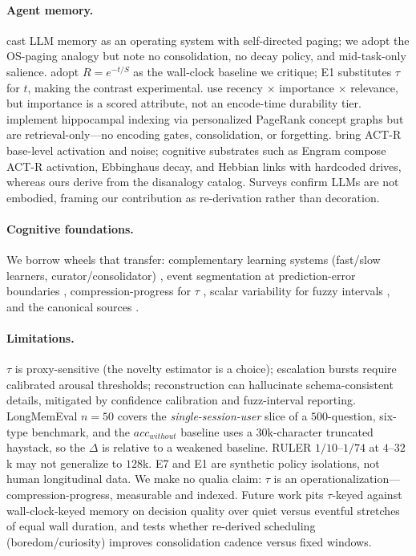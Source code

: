 \documentclass[letterpaper]{article}
\begin{document}
\paragraph{Agent memory.} \citet{packer2023memgpt} cast LLM memory as an operating system with self-directed paging; we adopt the OS-paging analogy but note no consolidation, no decay policy, and mid-task-only salience. \citet{zhong2023memorybank} adopt $R=e^{-t/S}$ as the wall-clock baseline we critique; E1 substitutes $\tau$ for $t$, making the contrast experimental. \citet{park2023generative} use recency $\times$ importance $\times$ relevance, but importance is a scored attribute, not an encode-time durability tier. \citet{gutierrez2024hipporag} implement hippocampal indexing via personalized PageRank concept graphs but are retrieval-only---no encoding gates, consolidation, or forgetting. \citet{liu2024actr} bring ACT-R base-level activation and noise; cognitive substrates such as Engram \citep{engram2024} compose ACT-R activation, Ebbinghaus decay, and Hebbian links with hardcoded drives, whereas ours derive from the disanalogy catalog. Surveys \citep{niu2024survey} confirm LLMs are not embodied, framing our contribution as re-derivation rather than decoration.

\paragraph{Cognitive foundations.} We borrow wheels that transfer: complementary learning systems (fast/slow learners, curator/consolidator) \citep{mcclelland1995cls}, event segmentation at prediction-error boundaries \citep{zacks2007event}, compression-progress for $\tau$ \citep{schmidhuber1991curiosity}, scalar variability for fuzzy intervals \citep{gibbon1977scalar}, and the canonical sources \citep{james1890principles,ebbinghaus1885memory,bartlett1932remembering,atkinson1968human,tulving1972episodic,tulving1983elements,collins1975spreading,conway2000sms,bergson1889duree,schacter2001seven}.

\paragraph{Limitations.} $\tau$ is proxy-sensitive (the novelty estimator is a choice); escalation bursts require calibrated arousal thresholds; reconstruction can hallucinate schema-consistent details, mitigated by confidence calibration and fuzz-interval reporting. LongMemEval $n{=}50$ covers the \emph{single-session-user} slice of a $500$-question, six-type benchmark, and the $acc_{without}$ baseline uses a $30$k-character truncated haystack, so the $\Delta$ is relative to a weakened baseline. RULER $1/10$--$1/74$ at $4$--$32$k may not generalize to $128$k. E7 and E1 are synthetic policy isolations, not human longitudinal data. We make no qualia claim: $\tau$ is an operationalization---compression-progress, measurable and indexed. Future work pits $\tau$-keyed against wall-clock-keyed memory on decision quality over quiet versus eventful stretches of equal wall duration, and tests whether re-derived scheduling (boredom/curiosity) improves consolidation cadence versus fixed windows.
\end{document}
